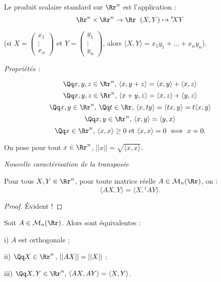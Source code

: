 \documentclass[class=report,crop=false]{standalone}
\begin{document}
\begin{definition}
Le produit scalaire standard sur $\Rr^n$ est l'application :
\[\Rr^n \times \Rr^n \to \Rr \;\; (X,Y) \mapsto {}^t\!XY \]

(si $X=\left(\begin{array}{c}
x_1\\
\vdots\\
x_n
\end{array}\right)$ et $Y=\left(\begin{array}{c}
y_1\\
\vdots\\
y_n
\end{array}\right)$, alors $\langle X, Y\rangle = x_1y_1+...+x_ny_n$).\end{definition}

{\it Propriétés :}

\[\Qq x,y,z \in \Rr^n,\, \langle x, y+z \rangle = \langle x,y \rangle + \langle x , z \rangle\]
\[\Qq x,y,z \in \Rr^n,\, \langle x+y, z \rangle = \langle x,z \rangle + \langle y , z \rangle\]
\[\Qq x,y \in \Rr^n,\,\Qq t \in \Rr,\, \langle x, ty \rangle = \langle tx,y \rangle = t\langle x , y\rangle\]
\[\Qq x,y \in \Rr^n,\, \langle x ,y \rangle = \langle y, x \rangle \]
\[\Qq x \in \Rr^n,\, \langle x, x \rangle \ge 0 \text{ et } \langle x, x \rangle = 0 \iff x =0. \]


\begin{definition}
On pose pour tout $x \in \Rr^n$, $||x|| = \sqrt{\langle x , x \rangle}$.
\end{definition}

{ \it Nouvelle caractérisation de la transposée}

\begin{proposition}
Pour tous $X,Y\in \Rr^n$, pour toute matrice réelle $A \in \mathcal{M}_n(\Rr)$, on :
\[\langle AX,Y\rangle = \langle X, {}^t\!AY \rangle .\]
\end{proposition}

\begin{proof}
Évident !
\end{proof}



\begin{proposition}
Soit $A \in \mathcal{M}_n(\Rr)$. Alors sont équivalentes :

i) $A$ est orthogonale ;

ii) $\Qq X \in \Rr^n \,,\, ||AX || = ||X|| $ ;

iii) $\Qq X,Y \in \Rr^n,\, \langle AX , AY \rangle = \langle X , Y \rangle$.
\end{proposition}
\end{document}
